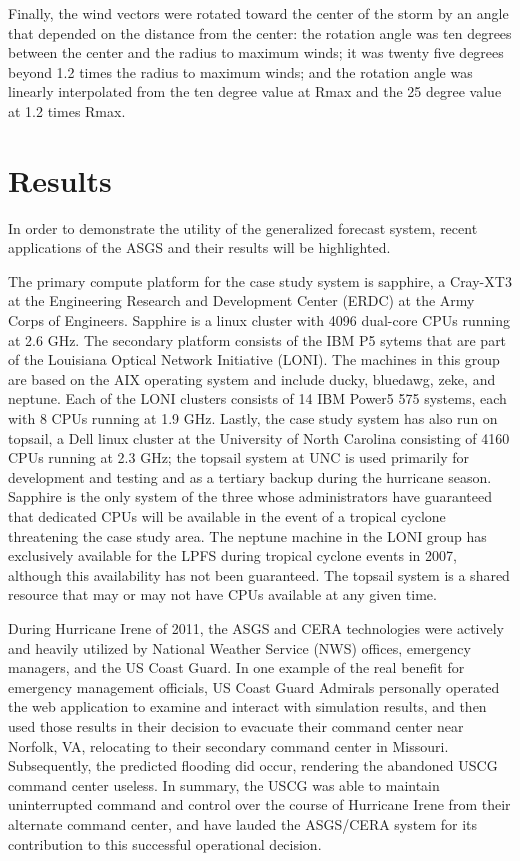 \documentclass[12pt]{article}
\begin{document}
Finally, the wind vectors were rotated toward the center of the 
storm by an angle that depended on the distance from the center: the 
rotation angle was ten degrees between the center and the radius to 
maximum winds; it was twenty five degrees beyond 1.2 times the 
radius to maximum winds; and the rotation angle was linearly 
interpolated from the ten degree value at Rmax and the 25 degree 
value at 1.2 times Rmax.

\section{Results}

In order to demonstrate the utility of the generalized forecast 
system, recent applications of the ASGS and their results will be highlighted.

The primary compute platform for the case study system is sapphire, 
a Cray-XT3 at the Engineering Research and Development Center (ERDC) 
at the Army Corps of Engineers. Sapphire is a linux cluster with 
4096 dual-core CPUs running at 2.6 GHz. The secondary platform 
consists of the IBM P5 sytems that are part of the Louisiana Optical 
Network Initiative (LONI). The machines in this group are based on 
the AIX operating system and include ducky, bluedawg, zeke, and 
neptune. Each of the LONI clusters consists of 14 IBM Power5 575 
systems, each with 8 CPUs running at 1.9 GHz. Lastly, the case study 
system has also run on topsail, a Dell linux cluster at the 
University of North Carolina consisting of 4160 CPUs running at 2.3 
GHz; the topsail system at UNC is used primarily for development and 
testing and as a tertiary backup during the hurricane season. 
Sapphire is the only system of the three whose administrators have 
guaranteed that dedicated CPUs will be available in the event of a 
tropical cyclone threatening the case study area. The neptune 
machine in the LONI group has exclusively available for the LPFS 
during tropical cyclone events in 2007, although this availability 
has not been guaranteed. The topsail system is a shared resource 
that may or may not have CPUs available at any given time.

During Hurricane Irene of 2011, the ASGS and CERA technologies were 
actively and heavily utilized by National Weather Service (NWS) 
offices, emergency managers, and the US Coast Guard. In one example 
of the real benefit for emergency management officials, US Coast 
Guard Admirals personally operated the web application to examine 
and interact with simulation results, and then used those results in 
their decision to evacuate their command center near Norfolk, VA, 
relocating to their secondary command center in Missouri. 
Subsequently, the predicted flooding did occur, rendering the 
abandoned USCG command center useless. In summary, the USCG was able 
to maintain uninterrupted command and control over the course of 
Hurricane Irene from their alternate command center, and have lauded 
the ASGS/CERA system for its contribution to this successful 
operational decision.
\end{document}
